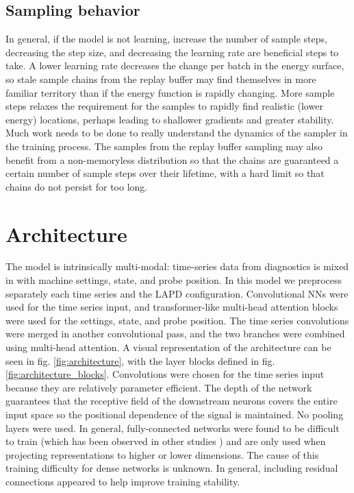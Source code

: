 \subsection{Sampling behavior}
In general, if the model is not learning, increase the number of sample steps, decreasing the step size, and decreasing the learning rate are beneficial steps to take. A lower learning rate decreases the change per batch in the energy surface, so stale sample chains from the replay buffer may find themselves in more familiar territory than if the energy function is rapidly changing. More sample steps relaxes the requirement for the samples to rapidly find realistic (lower energy) locations, perhaps leading to shallower gradients and greater stability. Much work needs to be done to really understand the dynamics of the sampler in the training process. The samples from the replay buffer sampling may also benefit from a non-memoryless distribution so that the chains are guaranteed a certain number of sample steps over their lifetime, with a hard limit so that chains do not persist for too long. 

\section{Architecture}

The model is intrinsically multi-modal: time-series data from diagnostics is mixed in with machine settings, state, and probe position. In this model we preprocess separately each time series and the LAPD configuration. Convolutional NNs were used for the time series input, and transformer-like multi-head attention blocks were used for the settings, state, and probe position. The time series convolutions were merged in another convolutional pass, and the two branches were combined using multi-head attention.  A visual representation of the architecture can be seen in fig. \ref{fig:architecture}, with the layer blocks defined in fig. \ref{fig:architecture_blocks}. Convolutions were chosen for the time series input because they are relatively parameter efficient.  The depth of the network guarantees that the receptive field of the downstream neurons covers the entire input space so the positional dependence of the signal is maintained. No pooling layers were used. In general, fully-connected networks were found to be difficult to train (which has been observed in other studies \cite{cheng_versatile_2024}) and are only used when projecting representations to higher or lower dimensions. The cause of this training difficulty for dense networks is unknown. In general, including residual connections appeared to help improve training stability.

